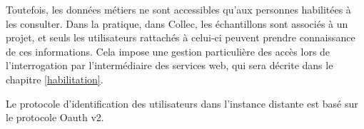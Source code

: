 Toutefois, les données \og métiers \fg ne sont accessibles qu'aux personnes habilitées à les consulter. Dans la pratique, dans Collec, les échantillons sont associés à un projet, et seuls les utilisateurs rattachés à celui-ci peuvent prendre connaissance de ces informations.
Cela impose une gestion particulière des accès lors de l'interrogation par l'intermédiaire des services web, qui sera décrite dans le chapitre \ref{habilitation}.

Le protocole d'identification des utilisateurs dans l'instance distante est basé sur le protocole Oauth v2.

